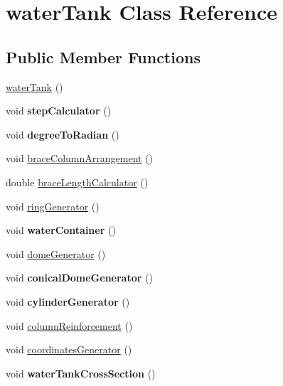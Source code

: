 \hypertarget{classwaterTank}{\section{water\-Tank \-Class \-Reference}
\label{classwaterTank}
}
\subsection*{\-Public \-Member \-Functions}
\begin{DoxyCompactItemize}
\item 
\hyperlink{classwaterTank_a195bcfec2c43e7dc76fb354cc5ad5663}{water\-Tank} ()
\item 
\hypertarget{classwaterTank_a24ad915e6c6404aeb606cd08f9879b3f}{void {\bfseries step\-Calculator} ()}\label{classwaterTank_a24ad915e6c6404aeb606cd08f9879b3f}

\item 
\hypertarget{classwaterTank_a6239a7f7005abefe4497f552970da6a3}{void {\bfseries degree\-To\-Radian} ()}\label{classwaterTank_a6239a7f7005abefe4497f552970da6a3}

\item 
void \hyperlink{classwaterTank_a744b12b9429aba6ab4819a9e6ec08e57}{brace\-Column\-Arrangement} ()
\item 
double \hyperlink{classwaterTank_a5c92d6a07305b90c50abc6233780ed6a}{brace\-Length\-Calculator} ()
\item 
void \hyperlink{classwaterTank_a53ffb279bff03d5094bf09f8b05c1d6b}{ring\-Generator} ()
\item 
\hypertarget{classwaterTank_a9b8642bc3276cee3c6278d27c1508d8b}{void {\bfseries water\-Container} ()}\label{classwaterTank_a9b8642bc3276cee3c6278d27c1508d8b}

\item 
void \hyperlink{classwaterTank_a5eadc36c15c14e27ba1f111fac7e546a}{dome\-Generator} ()
\item 
\hypertarget{classwaterTank_a3500a75dcaa0911ce1a3710b992c42ea}{void {\bfseries conical\-Dome\-Generator} ()}\label{classwaterTank_a3500a75dcaa0911ce1a3710b992c42ea}

\item 
\hypertarget{classwaterTank_a381e1f28715c06ba4207984c967d8eae}{void {\bfseries cylinder\-Generator} ()}\label{classwaterTank_a381e1f28715c06ba4207984c967d8eae}

\item 
void \hyperlink{classwaterTank_ae40c111a4632ff1fb63c1bfea8b95200}{column\-Reinforcement} ()
\item 
void \hyperlink{classwaterTank_aab46efedd17df10b7f59d99fdbb7c2d0}{coordinates\-Generator} ()
\item 
\hypertarget{classwaterTank_ae6cf919e6c536d14c9001dd197e74f7c}{void {\bfseries water\-Tank\-Cross\-Section} ()}\label{classwaterTank_ae6cf919e6c536d14c9001dd197e74f7c}


\end{DoxyCompactItemize}

